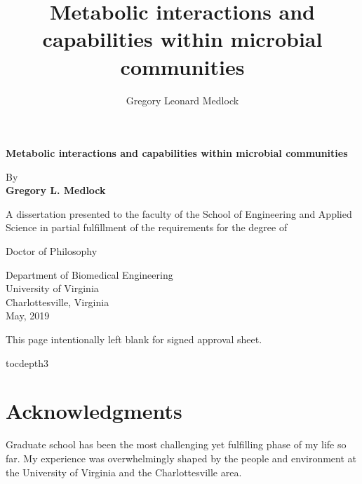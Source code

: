 \documentclass[11pt,onecolumn,notitlepage,openany,twoside]{book}
\title{Metabolic interactions and capabilities within microbial communities}
\author{Gregory Leonard Medlock}
\begin{document}
\frontmatter

\clearpage
\begin{titlepage}
   \begin{center}
       \vspace*{1cm}

       \LARGE
       \textbf{Metabolic interactions and capabilities within microbial communities}


       \vspace{1.5cm}

       \Large
       By\\
       \textbf{Gregory L. Medlock}

       \vspace{2.5cm}

       A dissertation presented to the faculty of the School of Engineering and Applied Science in partial fulfillment of the requirements for the degree of\\

       \vspace{1.5cm}

       Doctor of Philosophy

       \vspace{1.5cm}

       Department of Biomedical Engineering\\
       University of Virginia\\
       Charlottesville, Virginia\\
       May, 2019

   \end{center}
\end{titlepage}

\clearpage
This page intentionally left blank for signed approval sheet.
\clearpage

\begingroup
\let\clearpage


\setcounter{tocdepth}{3}
\tableofcontents
\hspace{1.5cm}
\listoffigures
\hspace{1.5cm}


\endgroup
\clearpage
{}
\section{Acknowledgments}
\thispagestyle{plain}
Graduate school has been the most challenging yet fulfilling phase of my life so far. My experience was overwhelmingly shaped by the people and environment at the University of Virginia and the Charlottesville area.
\end{document}
